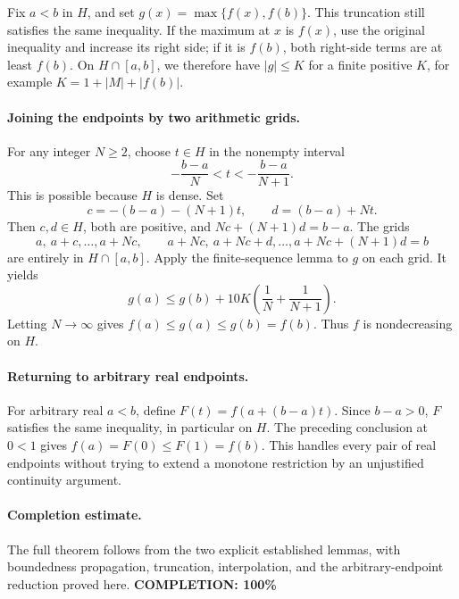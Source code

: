 Fix \(a<b\) in \(H\), and set \(g(x)=\max\{f(x),f(b)\}\).
This truncation still satisfies the same inequality. If the maximum at \(x\) is \(f(x)\), use the original inequality and increase its right side; if it is \(f(b)\), both right-side terms are at least \(f(b)\).
On \(H\cap[a,b]\), we therefore have \(|g|\leq K\) for a finite positive \(K\), for example \(K=1+|M|+|f(b)|\).

\paragraph{Joining the endpoints by two arithmetic grids.}
For any integer \(N\geq2\), choose \(t\in H\) in the nonempty interval
\[
 -\frac{b-a}{N}<t<-\frac{b-a}{N+1}.
\]
This is possible because \(H\) is dense. Set
\[
 c=-(b-a)-(N+1)t,\qquad d=(b-a)+Nt.
\]
Then \(c,d\in H\), both are positive, and \(Nc+(N+1)d=b-a\).
The grids
\[
 a,\ a+c,\ldots,a+Nc,\qquad
 a+Nc,\ a+Nc+d,\ldots,a+Nc+(N+1)d=b
\]
are entirely in \(H\cap[a,b]\).
Apply the finite-sequence lemma to \(g\) on each grid. It yields
\[
 g(a)\leq g(b)+10K\left(\frac1N+\frac1{N+1}\right).
\]
Letting \(N\to\infty\) gives \(f(a)\leq g(a)\leq g(b)=f(b)\). Thus \(f\) is nondecreasing on \(H\).

\paragraph{Returning to arbitrary real endpoints.}
For arbitrary real \(a<b\), define \(F(t)=f(a+(b-a)t)\). Since \(b-a>0\), \(F\) satisfies the same inequality, in particular on \(H\). The preceding conclusion at \(0<1\) gives \(f(a)=F(0)\leq F(1)=f(b)\).
This handles every pair of real endpoints without trying to extend a monotone restriction by an unjustified continuity argument.

\paragraph{Completion estimate.}
The full theorem follows from the two explicit established lemmas, with boundedness propagation, truncation, interpolation, and the arbitrary-endpoint reduction proved here.
\textbf{COMPLETION: 100\%}
